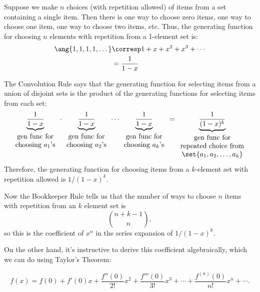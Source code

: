 Suppose we make $n$ choices (with repetition allowed) of items from a set
containing a single item.  Then there is one way to choose zero items, one
way to choose one item, one way to choose two items, etc.  Thus, the
generating function for choosing $n$ elements with repetition from a
1-element set is:
%
\begin{align*}
\ang{1, 1, 1, 1, \dots}
     & \corresp  1 + x + x^2 + x^3 + \cdots \\
     & =  \frac{1}{1-x}
\end{align*}

The Convolution Rule says that the generating function for selecting
items from a union of disjoint sets is the product of the generating
functions for selecting items from each set:
%
\[
\underbrace{\frac{1}{1-x}}_{
\begin{array}{cc}
\mbox{gen func for} \\
\text{choosing $a_1$'s}
\end{array}}
\cdot
\underbrace{\frac{1}{1-x}}_{
\begin{array}{cc}
\mbox{gen func for} \\
\text{choosing $a_2$'s}
\end{array}}
\cdots
\underbrace{\frac{1}{1-x}}_{
\begin{array}{cc}
\mbox{gen func for} \\
\text{choosing $a_k$'s}
\end{array}}
=
\underbrace{\frac{1}{(1-x)^k}}_{
\begin{array}{cc}
\mbox{gen func for} \\
\text{repeated choice from} \\
\set{a_1, a_2, \dots, a_k}
\end{array}}
\]
%
Therefore, the generating function for choosing items from a
$k$-element set with repetition allowed is $1 / (1 - x)^k$.

Now the Bookkeeper Rule tells us that the number of ways to choose $n$
items with repetition from an $k$ element set is
\[
\binom{n+k-1}{n},
\]
so this is the coefficient of $x^n$ in the series expansion of $1 / (1 -
x)^k$.

On the other hand, it's instructive to derive this coefficient
algebraically, which we can do using Taylor's Theorem:

\begin{theorem}
\[
f(x) = f(0) + f'(0) x + \frac{f''(0)}{2!} x^2 + \frac{f'''(0)}{3!} x^3 + \cdots
+ \frac{f^{(n)}(0)}{n!} x^n + \cdots.
\]
\end{theorem}

